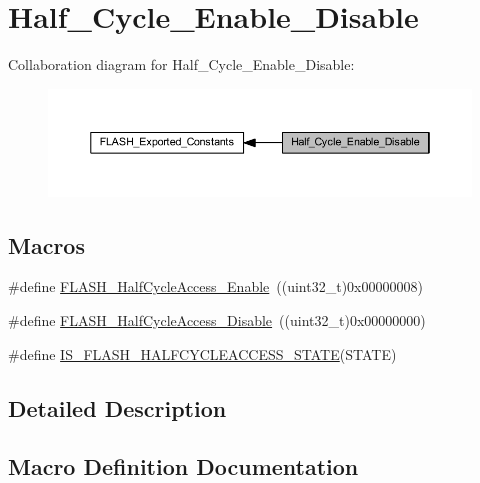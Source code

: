 \hypertarget{group___half___cycle___enable___disable}{}\section{Half\+\_\+\+Cycle\+\_\+\+Enable\+\_\+\+Disable}
\label{group___half___cycle___enable___disable}
Collaboration diagram for Half\+\_\+\+Cycle\+\_\+\+Enable\+\_\+\+Disable\+:
\nopagebreak
\begin{figure}[H]
\begin{center}
\leavevmode
\includegraphics[width=350pt]{group___half___cycle___enable___disable}
\end{center}
\end{figure}
\subsection*{Macros}
\begin{DoxyCompactItemize}
\item 
\#define \hyperlink{group___half___cycle___enable___disable_ga95adf58ccf48094a9648085ac8d8af13}{F\+L\+A\+S\+H\+\_\+\+Half\+Cycle\+Access\+\_\+\+Enable}~((uint32\+\_\+t)0x00000008)
\item 
\#define \hyperlink{group___half___cycle___enable___disable_gad1ec816fa04b9a45e51c1cc9f1ba8f42}{F\+L\+A\+S\+H\+\_\+\+Half\+Cycle\+Access\+\_\+\+Disable}~((uint32\+\_\+t)0x00000000)
\item 
\#define \hyperlink{group___half___cycle___enable___disable_gad1b9e84a20436dcfe1a1ade4c26dc028}{I\+S\+\_\+\+F\+L\+A\+S\+H\+\_\+\+H\+A\+L\+F\+C\+Y\+C\+L\+E\+A\+C\+C\+E\+S\+S\+\_\+\+S\+T\+A\+TE}(S\+T\+A\+TE)
\end{DoxyCompactItemize}


\subsection{Detailed Description}


\subsection{Macro Definition Documentation}
\mbox{\label{group___half___cycle___enable___disable_gad1ec816fa04b9a45e51c1cc9f1ba8f42}} 
